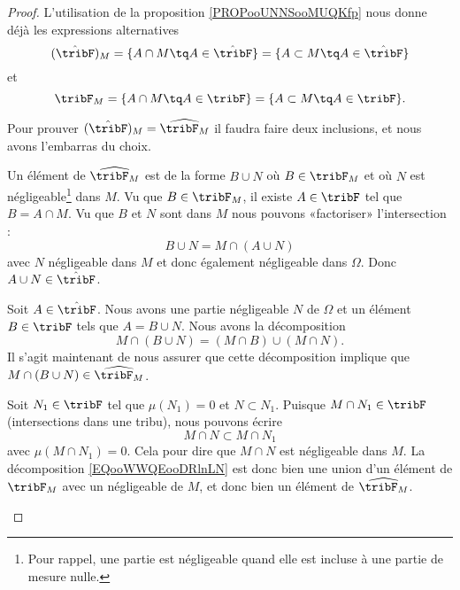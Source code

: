 \begin{proof}
	L'utilisation de la proposition \ref{PROPooUNNSooMUQKfp} nous donne déjà les expressions alternatives
	\begin{equation}
		(\hat\tribF)_M=\{ A\cap M\tq A\in\hat\tribF \}=\{ A\subset M\tq A\in\hat\tribF \}
	\end{equation}
	et
	\begin{equation}
		\tribF_M=\{ A\cap M\tq A\in\tribF \}=\{ A\subset M\tq A\in\tribF \}.
	\end{equation}

	Pour prouver \( (\hat\tribF)_M=\widehat{\tribF_M}\) il faudra faire deux inclusions, et nous avons l'embarras du choix.
	\begin{subproof}
		Un élément de \( \widehat{\tribF_M}\) est de la forme \( B\cup N\) où \( B\in \tribF_M\) et où \( N\) est négligeable\footnote{Pour rappel, une partie est négligeable quand elle est incluse à une partie de mesure nulle.} dans \( M\). Vu que \( B\in\tribF_M\), il existe \( A\in\tribF\) tel que \( B=A\cap M\). Vu que \( B\) et \( N\) sont dans \( M\) nous pouvons «factoriser» l'intersection :
		\begin{equation}
			B\cup N=M\cap (A\cup N)
		\end{equation}
		avec \( N\) négligeable dans \( M\) et donc également négligeable dans \( \Omega\). Donc \( A\cup N\in \hat\tribF\).


		Soit \( A\in\hat\tribF\). Nous avons une partie négligeable \( N\) de \( \Omega\) et un élément \( B\in \tribF\) tels que \( A=B\cup N\). Nous avons la décomposition
		\begin{equation}        \label{EQooWWQEooDRlnLN}
			M\cap(B\cup N)=(M\cap B)\cup(M\cap N).
		\end{equation}
		Il s'agit maintenant de nous assurer que cette décomposition implique que \( M\cap(B\cup N)\in \widehat{\tribF_M}\).

		Soit \( N_1\in \tribF\) tel que \( \mu(N_1)=0\) et \( N\subset N_1\). Puisque \( M\cap N_1\in \tribF\) (intersections dans une tribu), nous pouvons écrire
		\begin{equation}
			M\cap N\subset M\cap N_1
		\end{equation}
		avec \( \mu(M\cap N_1)=0\). Cela pour dire que \( M\cap N\) est négligeable dans \( M\). La décomposition \eqref{EQooWWQEooDRlnLN} est donc bien une union d'un élément de \( \tribF_M\) avec un négligeable de \( M\), et donc bien un élément de \( \widehat{\tribF_M}\).
	\end{subproof}
\end{proof}

